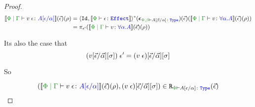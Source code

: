 \begin{proof}
    \begin{align*}
        \deno{\gpetyperelation{\eapp{v}{\e}}{A\ssub{\a}{\e}}}\fundRho 
        & = \pr{\Id{}}{\deno{\wellformede{\P}{\e}}}\star(\counit{\wellformedt{\P,\b}{A\ssub{\a}{\b}}})(\ev)(\deno{\gpetyperelation{v}{\all{\a}{A}}}\fundRho)\\
        & = \pi_{\e'}(\deno{\gpetyperelation{v}{\all{\a}{A}}}\fundRho)
    \end{align*}
    
    Its also the case that
    \begin{equation}
        (v[\vec{\epsilon} / \vec{\alpha}][\sigma])\;\epsilon' = (v\;\epsilon)[\vec{\epsilon} / \vec{\alpha}][\sigma]
    \end{equation}
    
    So
    
    \begin{equation}
        \inLogRelPE{\deno{\gpetyperelation{\eapp{v}{\e}}{A\ssub{\a}{\e}}}\fundRho }{(\eapp{v}{\e})\fundSub}{A\ssub{\a}{\e}}
    \end{equation}
\end{proof}